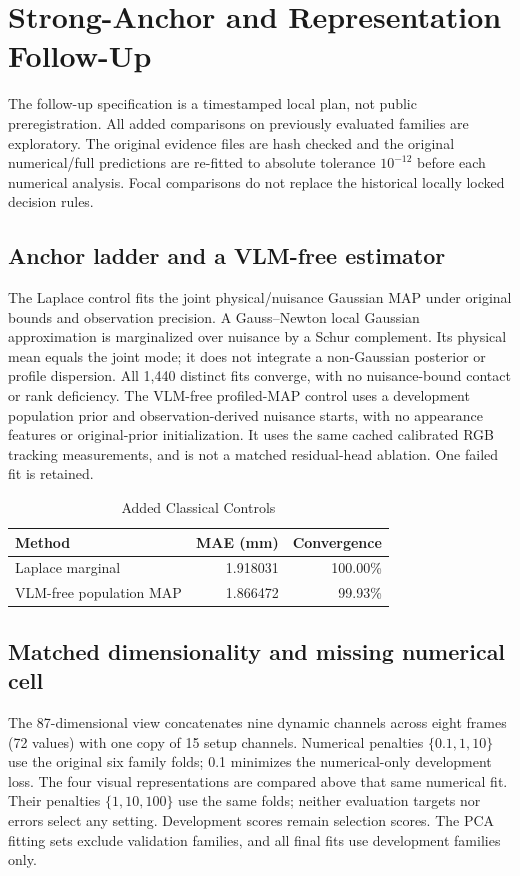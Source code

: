 \section{Strong-Anchor and Representation Follow-Up}
The follow-up specification is a timestamped local plan, not public preregistration. All added comparisons on previously evaluated families are exploratory. The original evidence files are hash checked and the original numerical/full predictions are re-fitted to absolute tolerance $10^{-12}$ before each numerical analysis. Focal comparisons do not replace the historical locally locked decision rules.

\subsection{Anchor ladder and a VLM-free estimator}
The Laplace control fits the joint physical/nuisance Gaussian MAP under original bounds and observation precision. A Gauss--Newton local Gaussian approximation is marginalized over nuisance by a Schur complement. Its physical mean equals the joint mode; it does not integrate a non-Gaussian posterior or profile dispersion. All 1,440 distinct fits converge, with no nuisance-bound contact or rank deficiency. The VLM-free profiled-MAP control uses a development population prior and observation-derived nuisance starts, with no appearance features or original-prior initialization. It uses the same cached calibrated RGB tracking measurements, and is not a matched residual-head ablation. One failed fit is retained.

\begin{table}[htbp]\centering\small
\caption{Added Classical Controls}\label{tab:fu_anchors}
\begin{tabular}{lrr}\toprule
Method & MAE (mm) & Convergence\\\midrule
Laplace marginal & 1.918031 & 100.00\%\\
VLM-free population MAP & 1.866472 & 99.93\%\\
\bottomrule\end{tabular}
\end{table}
\subsection{Matched dimensionality and missing numerical cell}
The 87-dimensional view concatenates nine dynamic channels across eight frames (72 values) with one copy of 15 setup channels. Numerical penalties $\{0.1,1,10\}$ use the original six family folds; 0.1 minimizes the numerical-only development loss. The four visual representations are compared above that same numerical fit. Their penalties $\{1,10,100\}$ use the same folds; neither evaluation targets nor errors select any setting. Development scores remain selection scores. The PCA fitting sets exclude validation families, and all final fits use development families only.

